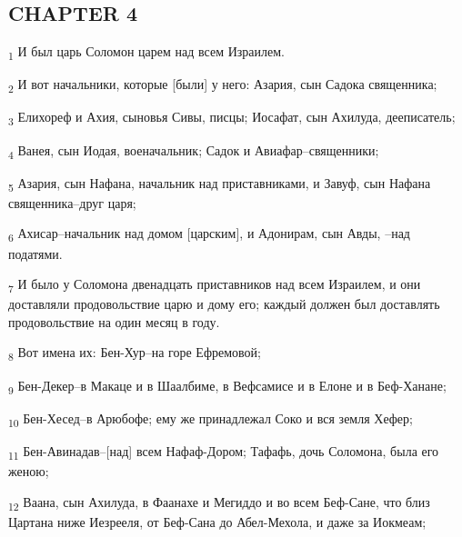 \subsection{CHAPTER 4}
\begin{tcolorbox}
\textsubscript{1} И был царь Соломон царем над всем Израилем.
\end{tcolorbox}
\begin{tcolorbox}
\textsubscript{2} И вот начальники, которые [были] у него: Азария, сын Садока священника;
\end{tcolorbox}
\begin{tcolorbox}
\textsubscript{3} Елихореф и Ахия, сыновья Сивы, писцы; Иосафат, сын Ахилуда, дееписатель;
\end{tcolorbox}
\begin{tcolorbox}
\textsubscript{4} Ванея, сын Иодая, военачальник; Садок и Авиафар--священники;
\end{tcolorbox}
\begin{tcolorbox}
\textsubscript{5} Азария, сын Нафана, начальник над приставниками, и Завуф, сын Нафана священника--друг царя;
\end{tcolorbox}
\begin{tcolorbox}
\textsubscript{6} Ахисар--начальник над домом [царским], и Адонирам, сын Авды, --над податями.
\end{tcolorbox}
\begin{tcolorbox}
\textsubscript{7} И было у Соломона двенадцать приставников над всем Израилем, и они доставляли продовольствие царю и дому его; каждый должен был доставлять продовольствие на один месяц в году.
\end{tcolorbox}
\begin{tcolorbox}
\textsubscript{8} Вот имена их: Бен-Хур--на горе Ефремовой;
\end{tcolorbox}
\begin{tcolorbox}
\textsubscript{9} Бен-Декер--в Макаце и в Шаалбиме, в Вефсамисе и в Елоне и в Беф-Ханане;
\end{tcolorbox}
\begin{tcolorbox}
\textsubscript{10} Бен-Хесед--в Арюбофе; ему же принадлежал Соко и вся земля Хефер;
\end{tcolorbox}
\begin{tcolorbox}
\textsubscript{11} Бен-Авинадав--[над] всем Нафаф-Дором; Тафафь, дочь Соломона, была его женою;
\end{tcolorbox}
\begin{tcolorbox}
\textsubscript{12} Ваана, сын Ахилуда, в Фаанахе и Мегиддо и во всем Беф-Сане, что близ Цартана ниже Иезрееля, от Беф-Сана до Абел-Мехола, и даже за Иокмеам;
\end{tcolorbox}
